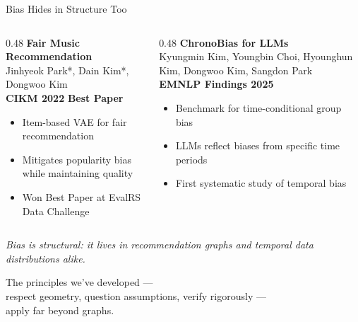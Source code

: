\documentclass[aspectratio=169,11pt]{beamer}
\newcommand{\papercite}[1]{{\scriptsize\color{mutedText}#1}}
\newcommand{\venue}[1]{{\small\textcolor{postechBlue}{\textbf{#1}}}}
\newcommand{\badge}[1]{\colorbox{anuGold}{\scriptsize\color{white}\textbf{#1}}}
\begin{document}
\begin{frame}{Bias Hides in Structure Too}
\begin{columns}[T]
\begin{column}{0.48\textwidth}
  \textbf{Fair Music Recommendation} \\
  \papercite{Jinhyeok Park*, Dain Kim*, Dongwoo Kim} \\
  \venue{CIKM 2022} \badge{Best Paper} \\[6pt]
  \begin{itemize}
    \item Item-based VAE for fair recommendation
    \item Mitigates popularity bias while maintaining quality
    \item Won Best Paper at EvalRS Data Challenge
  \end{itemize}
\end{column}
\begin{column}{0.48\textwidth}
  \textbf{ChronoBias for LLMs} \\
  \papercite{Kyungmin Kim, Youngbin Choi, Hyounghun Kim, Dongwoo Kim, Sangdon Park} \\
  \venue{EMNLP Findings 2025} \\[6pt]
  \begin{itemize}
    \item Benchmark for time-conditional group bias
    \item LLMs reflect biases from specific time periods
    \item First systematic study of temporal bias
  \end{itemize}
\end{column}
\end{columns}
\vspace{6pt}
{\small\textit{Bias is structural: it lives in recommendation graphs and temporal data distributions alike.}}
\end{frame}

\begin{frame}[plain]
  \vspace{2cm}
  \begin{center}
    {\Large\textcolor{postechBlue}{The principles we've developed ---}}\\[6pt]
    {\large\textcolor{postechBlue}{respect geometry, question assumptions, verify rigorously ---}}\\[12pt]
    {\Large\textcolor{mutedText}{apply far beyond graphs.}}
  \end{center}
\end{frame}
\end{document}
